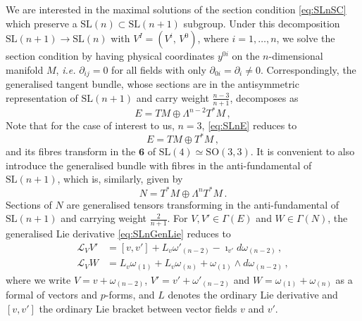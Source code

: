 \documentclass[a4paper, 11pt]{article}
\numberwithin{equation}{section}
\newcommand{\SL}[1]{\mathrm{SL}( #1 )}
\newcommand{\SO}[1]{\mathrm{SO}( #1 )}
\newcommand{\+}{\oplus}
\newcommand{\gL}{\mathcal{L}}
\begin{document}
We are interested in the maximal solutions of the section condition \eqref{eq:SLnSC} which preserve a $\SL{n} \subset \SL{n+1}$ subgroup. Under this decomposition $\SL{n+1} \rightarrow \SL{n}$ with $V^I = \left( V^i,\, V^0 \right)$, where $i = 1, \ldots, n$, we solve the section condition by having physical coordinates $y^{0i}$ on the $n$-dimensional manifold $M$, \textit{i.e.} $\partial_{ij} = 0$ for all fields with only $\partial_{0i} = \partial_i \neq 0$. Correspondingly, the generalised tangent bundle, whose sections are in the antisymmetric representation of $\SL{n+1}$ and carry weight $\frac{n-3}{n+1}$, decomposes as
\begin{equation} \label{eq:SLnE}
	E = TM \oplus \Lambda^{n-2} T^*M \,,
\end{equation}
Note that for the case of interest to us, $n=3$, \eqref{eq:SLnE} reduces to
\begin{equation}
	E = TM \oplus T^*M \,,
\end{equation}
and its fibres transform in the $\mathbf{6}$ of $\SL{4} \simeq \SO{3,3}$. It is convenient to also introduce the generalised bundle with fibres in the anti-fundamental of $\SL{n+1}$, which is, similarly, given by
\begin{equation}
	N = T^*M \oplus \Lambda^{n} T^*M \,.
\end{equation}
Sections of $N$ are generalised tensors transforming in the anti-fundamental of $\SL{n+1}$ and carrying weight $\frac{2}{n+1}$. For $V, V' \in \Gamma(E)$ and $W \in \Gamma(N)$, the generalised Lie derivative \eqref{eq:SLnGenLie} reduces to
\begin{equation}
	\begin{split}
		\gL_{V} V' &= [v, v'] + L_{v} \omega'_{(n-2)} - \imath_{v'} d\omega_{(n-2)} \,, \\
		\gL_{V} W &= L_v \omega_{(1)} + L_v \omega_{(n)} + \omega_{(1)} \wedge d\omega_{(n-2)} \,,
	\end{split}
\end{equation}
where we write $V = v + \omega_{(n-2)}$, $V' = v' + \omega'_{(n-2)}$ and $W = \omega_{(1)} + \omega_{(n)}$ as a formal of vectors and $p$-forms, and $L$ denotes the ordinary Lie derivative and $[v,v']$ the ordinary Lie bracket between vector fields $v$ and $v'$.
\end{document}
